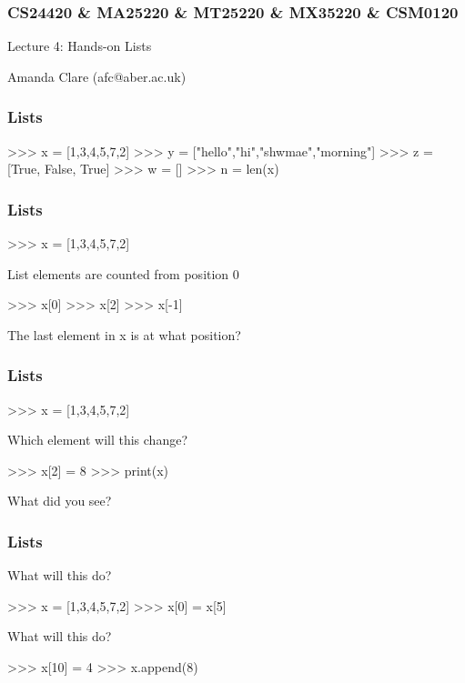 \documentclass{beamer}
\begin{document}

\begin{frame}
\frametitle{CS24420 \& MA25220 \& MT25220 \& MX35220 \& CSM0120}

\begin{center}
\begin{huge}
Lecture 4: Hands-on Lists 
\end{huge}
\bigskip

Amanda Clare (afc@aber.ac.uk)

\end{center}
\end{frame}


\begin{frame}[fragile]
\frametitle{Lists}
\begin{code}
>>> x = [1,3,4,5,7,2]
>>> y = ["hello","hi","shwmae","morning"]
>>> z = [True, False, True]
>>> w = []
>>> n = len(x)
\end{code}
\end{frame}




\begin{frame}[fragile]
\frametitle{Lists}
\begin{code}
>>> x = [1,3,4,5,7,2]
\end{code}
 List elements are counted from position 0
\begin{code}
>>> x[0]
>>> x[2]
>>> x[-1]
\end{code}
The last element in x is at what position?
\end{frame}

\begin{frame}[fragile]
\frametitle{Lists}
\begin{code}
>>> x = [1,3,4,5,7,2]
\end{code}
Which element will this change?
\begin{code}
>>> x[2] = 8
>>> print(x)
\end{code}
What did you see?
\end{frame}

\begin{frame}[fragile]
\frametitle{Lists}
What will this do?
\begin{code}
>>> x = [1,3,4,5,7,2]
>>> x[0] = x[5]
\end{code}
\bigskip
What will this do?
\begin{code}
>>> x[10] = 4
>>> x.append(8)
\end{code}
\end{frame}
\end{document}
